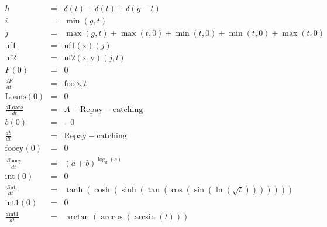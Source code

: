 \documentclass{article}
\begin{document}
\begin{eqnarray*}
h&=&\delta\left( t \right)+\delta\left( t \right)+\delta\left(g- t \right)\\
i&=&\min\left(g, t \right)\\
j&=&\max\left(g, t \right)+\max\left( t ,0\right)+\min\left( t ,0\right)+\min\left( t ,0\right)+\max\left( t ,0\right)\\
\mathrm{uf1}&=&\mathrm{uf1(x)}\left(j\right)\\
\mathrm{uf2}&=&\mathrm{uf2(x,y)}\left(j,l\right)\\
F(0)&=&0\\
\frac{ d F}{dt} &=&\mathrm{foo}\times  t \\
\mathrm{Loans}(0)&=&0\\
\frac{ d \mathrm{Loans}}{dt} &=&A+\mathrm{Repay}-\mathrm{catching}\\
b(0)&=&-0\\
\frac{ d b}{dt} &=&\mathrm{Repay}-\mathrm{catching}\\
\mathrm{fooey}(0)&=&0\\
\frac{ d \mathrm{fooey}}{dt} &=&\left(a+b\right)^{\log_{d}\left(c\right)}\\
\mathrm{int}(0)&=&0\\
\frac{ d \mathrm{int}}{dt} &=&\tanh\left(\cosh\left(\sinh\left(\tan\left(\cos\left(\sin\left(\ln\left(\sqrt{ t }\right)\right)\right)\right)\right)\right)\right)\\
\mathrm{int1}(0)&=&0\\
\frac{ d \mathrm{int1}}{dt} &=&\arctan\left(\arccos\left(\arcsin\left( t \right)\right)\right)\\
\end{eqnarray*}
\end{document}
